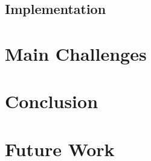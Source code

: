 \documentclass{article}
\begin{document}
	\subsection{Implementation}
	
	
	
	\section{Main Challenges}
	
	
	\section{Conclusion}
	
	\section{Future Work}
	
	
	
	
	
	
	
\end{document}
